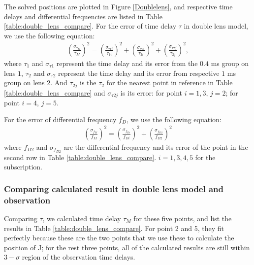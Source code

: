 \documentclass[useAMS,usenatbib]{mn2e}
\begin{document}
The solved positions are plotted in Figure \ref{Doublelens}, and respective time delays and differential frequencies are listed in Table \ref{table:double_lens_compare}. For the error of time delay $\tau$ in double lens model, we use the following equation: 
\begin{equation}
\begin{aligned}
(\frac{\sigma_{\tau_M}}{\tau_{M}})^2 = (\frac{\sigma_{\tau1i}}{\tau_{1i}})^2+(\frac{\sigma_{\tau2i}}{\tau_{2i}})^2 + (\frac{\sigma_{\tau2j}}{\tau_{2j}})^2,
\end{aligned}
\end{equation}
where $\tau_1$ and $\sigma_{\tau1}$ represent the time delay and its error from the $0.4$ ms group on lens $1$, $\tau_2$ and $\sigma_{\tau2}$ represent the time delay and its error from respective $1$ ms group on lens 2. And $\tau_{2j}$ is the $\tau_2$ for the nearest point in reference in Table \ref{table:double_lens_compare} and $\sigma_{\tau2j}$ is its error: for point $i=1,3$, $j=2$; for point $i=4$, $j=5$.

For the error of differential frequency $f_D$, we use the following equation:
\begin{equation}
\begin{aligned}
(\frac{\sigma_{f_M}}{f_M})^2=(\frac{\sigma_{f_{Di}}}{f_{Di}})^2+(\frac{\sigma_{f_{D2}}}{f_{D2}})^2
\end{aligned}
\end{equation}
where $f_{D2}$ and $\sigma_{f_{D2}}$ are the differential frequency and its error of the point in the second row in Table \ref{table:double_lens_compare}. $i=1,3,4,5$ for the subscription.

\subsubsection{Comparing calculated result in double lens model and observation}
Comparing $\tau$, we calculated time delay $\tau_M$ for these five points, and list the results in Table \ref{table:double_lens_compare}. For point 2 and 5, they fit perfectly because these are the two points that we use these to calculate the position of J; for the rest three points, all of the calculated results are still within $3-\sigma$ region of the observation time delays.
\end{document}
